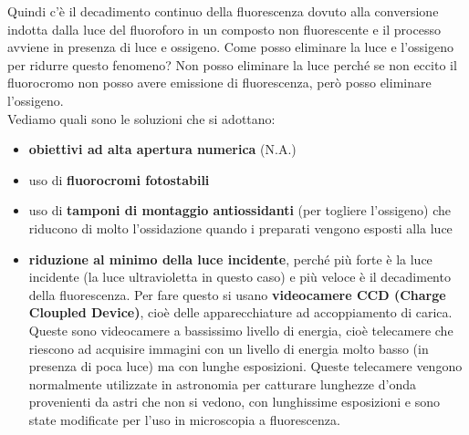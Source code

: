 \documentclass[11pt]{book}
\begin{document}
Quindi c’è il decadimento continuo della fluorescenza dovuto alla conversione indotta dalla luce del fluoroforo in un composto non fluorescente e il processo avviene in presenza di luce e ossigeno.
Come posso eliminare la luce e l’ossigeno per ridurre questo fenomeno? Non posso eliminare la luce perché se non eccito il fluorocromo non posso avere emissione di fluorescenza, però posso eliminare l’ossigeno.\\
Vediamo quali sono le soluzioni che si adottano:
\begin{itemize}
\item \textbf{obiettivi ad alta apertura numerica} (N.A.)
\item uso di \textbf{fluorocromi fotostabili}
\item uso di \textbf{tamponi di montaggio antiossidanti} (per togliere l’ossigeno) che riducono di molto l’ossidazione quando i preparati vengono esposti alla luce
\item \textbf{riduzione al minimo della luce incidente}, perché più forte è la luce incidente (la luce ultravioletta in questo caso) e più veloce è il decadimento della fluorescenza. Per fare questo si usano \textbf{videocamere CCD (Charge Cloupled Device)}, cioè delle apparecchiature ad accoppiamento di carica. Queste sono videocamere a bassissimo livello di energia, cioè telecamere che riescono ad acquisire immagini con un livello di energia molto basso (in presenza di poca luce) ma con lunghe esposizioni. Queste telecamere vengono normalmente utilizzate in astronomia per catturare lunghezze d’onda provenienti da astri che non si vedono, con lunghissime esposizioni e sono state modificate per l’uso in microscopia a fluorescenza.
\end{itemize}
\end{document}
